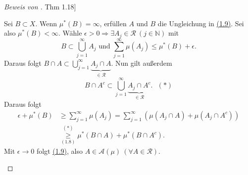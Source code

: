 \documentclass[a4paper]{scrreprt}
\newcommand{\N}{\mathbb{N}}
\newcommand{\jhyperref}[2]{\hyperref[j_#1]{#2}}
\newcommand{\jlink}[1]{\jhyperref{#1}{#1}}
\theoremstyle{plain}
\theoremstyle{definition}
\begin{document}
{{{\begin{proof}[Beweis von \jlink{Thm 1.18}]
\begin{itemize}
                Sei $B \subset X$. Wenn $\mu^*(B)=\infty$, erfüllen $A$ und $B$ die Ungleichung in \jlink{(1.9)}. Sei also $\mu^*(B) < \infty$. Wähle $\epsilon >0 \Rightarrow \exists A_j \in \mathcal{R}\ (j \in \N)$ mit 
                \begin{displaymath}
                    B \subset \bigcup_{j=1}^\infty A_j\text{ und }\sum_{j=1}^\infty \mu(A_j) \le \mu^*(B) + \epsilon.
                \end{displaymath}
                Daraus folgt $B\cap A \subset \bigcup_{j=1}^\infty \underbrace{A_j \cap A}_{\in \mathcal{R}}$. Nun gilt außerdem
                \begin{displaymath}
                    B \cap A^c \subset \bigcup_{j=1}^\infty \underbrace{A_j \cap A^c}_{\in \mathcal{R}}.\ \ \ (*)
                \end{displaymath}
                Daraus folgt
                \begin{displaymath}
                    \begin{split}
                        \epsilon + \mu^*(B) &\ge \sum_{j=1}^\infty \mu(A_j) = \sum_{j=1}^\infty (\mu(A_j \cap A) + \mu(A_j \cap A^c))\\
                        &\overset{(*)}{\underset{\jlink{(1.8)}}{\ge}} \mu^*(B\cap A) + \mu^*(B\cap A^c).
                    \end{split}
                \end{displaymath}
                 Mit $\epsilon \rightarrow 0$ folgt \jlink{(1.9)}, also $A \in \mathcal{A}(\mu) \ (\forall A\in \mathcal{R})$.
        \end{itemize}
\end{proof}


}}}
\end{document}
